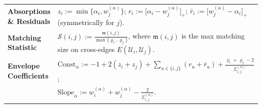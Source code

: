 \documentclass[twoside,11pt]{article}
\numberwithin{equation}{section}
\numberwithin{theorem}{section}
\numberwithin{example}{section}
\begin{document}
\begin{table}
\begin{tabular}{@{}p{}p{}@{}}
\textbf{Absorptions \& Residuals} & $z_i := \min\!\big\{\alpha_i,w^{(\alpha)}_j\big\}$; \quad $r_i := \big[\alpha_i-w^{(\alpha)}_j\big]_+$; \quad $\bar r_i := \big[w^{(\alpha)}_j-\alpha_i\big]_+$ (symmetrically for $j$). \\
\textbf{Matching Statistic} & $\mathscr S(i,j) := \frac{\mathfrak m(i,j)}{\max\{\varrho_i,\varrho_j\}}$, where $\mathfrak m(i,j)$ is the max matching size on cross-edges $E(\mathcal U_i,\mathcal U_j)$. \\
\textbf{Envelope Coefficients} & $\mathrm{Const}_\alpha := -1+2(z_i+z_j)+\sum_{u\in\{i,j\}}(r_u+\bar r_u)+\frac{\varrho_i+\varrho_j-2}{\Sigma^{(\alpha)}_{i,j}}$; \\
& $\mathrm{Slope}_\alpha := w^{(\alpha)}_i+w^{(\alpha)}_j-\frac{2}{\Sigma^{(\alpha)}_{i,j}}$. \\
\bottomrule
\end{tabular}
\end{table}
\end{document}
